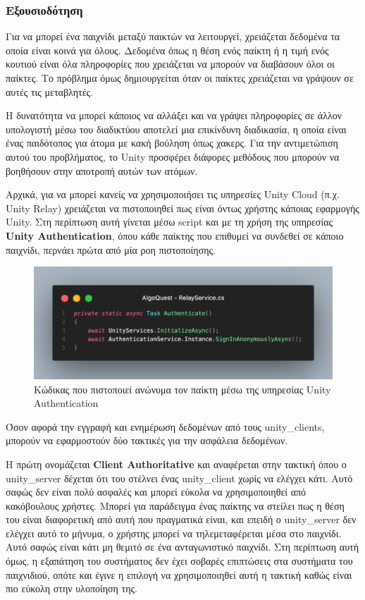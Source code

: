 
\subsubsection{Εξουσιοδότηση}

Για να μπορεί ένα παιχνίδι μεταξύ παικτών να λειτουργεί, χρειάζεται δεδομένα τα οποία είναι κοινά για όλους. Δεδομένα όπως η θέση ενός παίκτη ή η τιμή ενός κουτιού είναι όλα πληροφορίες που χρειάζεται να μπορούν να διαβάσουν όλοι οι παίκτες. Το πρόβλημα όμως δημιουργείται όταν οι παίκτες χρειάζεται να γράψουν σε αυτές τις μεταβλητές.

Η δυνατότητα να μπορεί κάποιος να αλλάξει και να γράψει πληροφορίες σε άλλον υπολογιστή μέσω του διαδικτύου αποτελεί μια επικίνδυνη διαδικασία, η οποία είναι ένας παιδότοπος για άτομα με κακή βούληση όπως χακερς. Για την αντιμετώπιση αυτού του προβλήματος, το Unity προσφέρει διάφορες μεθόδους που μπορούν να βοηθήσουν στην αποτροπή αυτών των ατόμων.

Αρχικά, για να μπορεί κανείς να χρησιμοποιήσει τις υπηρεσίες Unity Cloud (π.χ. Unity Relay) χρειάζεται να πιστοποιηθεί πως είναι όντως χρήστης κάποιας εφαρμογής Unity. Στη περίπτωση αυτή γίνεται μέσω script και με τη χρήση της υπηρεσίας \textbf{Unity Authentication}, όπου κάθε παίκτης που επιθυμεί να συνδεθεί σε κάποιο παιχνίδι, περνάει πρώτα από μία ροη πιστοποίησης.

\begin{figure}[H]
    \centering
    \includegraphics[width=0.8\linewidth]{sections/4/4/images/unity_code_unity_services_auth}
    \caption{Κώδικας που πιστοποιεί ανώνυμα τον παίκτη μέσω της υπηρεσίας Unity Authentication}
    \label{fig:unity_code_unity_services_auth}
\end{figure}

Όσον αφορά την εγγραφή και ενημέρωση δεδομένων από τους \Glspl{unity_client}, μπορούν να εφαρμοστούν δύο τακτικές για την ασφάλεια δεδομένων.

Η πρώτη ονομάζεται \textbf{Client Authoritative} και αναφέρεται στην τακτική όπου ο \Gls{unity_server} δέχεται ότι του στέλνει ένας \Gls{unity_client} χωρίς να ελέγχει κάτι. Αυτό σαφώς δεν είναι πολύ ασφαλές και μπορεί εύκολα να χρησιμοποιηθεί από κακόβουλους χρήστες. Μπορεί για παράδειγμα ένας παίκτης να στείλει πως η θέση του είναι διαφορετική από αυτή που πραγματικά είναι, και επειδή ο \Gls{unity_server} δεν ελέγχει αυτό το μήνυμα, ο χρήστης μπορεί να τηλεμεταφέρεται μέσα στο παιχνίδι. Αυτό σαφώς είναι κάτι μη θεμιτό σε ένα ανταγωνιστικό παιχνίδι. Στη περίπτωση αυτή όμως, η εξαπάτηση του συστήματος δεν έχει σοβαρές επιπτώσεις στα συστήματα του παιχνιδιού, οπότε και έγινε η επιλογή να χρησιμοποιηθεί αυτή η τακτική καθώς είναι πιο εύκολη στην υλοποίηση της.

